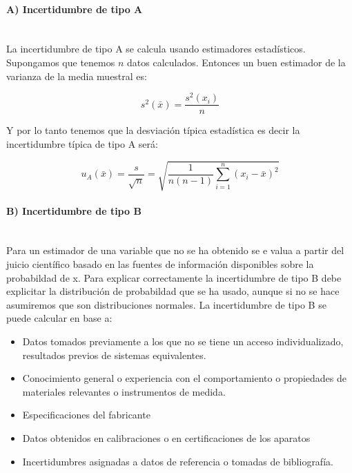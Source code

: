 \documentclass[12pt,a4paper]{book}
\begin{document}
\paragraph{A) Incertidumbre de tipo A \\ \\}

La incertidumbre de tipo A se calcula usando estimadores estadísticos. Supongamos que tenemos $n$ datos calculados. Entonces un buen estimador de la varianza de la media muestral es:

\begin{equation}
s^2(\bar{x}) = \dfrac{s^2(x_i)}{n}
\end{equation}

Y por lo tanto tenemos que la desviación típica estadística es decir la incertidumbre típica de tipo A será:

\begin{equation}
u_A(\bar{x}) = \dfrac{s}{\sqrt{n}} = \sqrt{\dfrac{1}{n (n-1)} \sum_{i=1}^n (x_i - \bar{x})^2}
\end{equation}

\paragraph{B) Incertidumbre de tipo B \\ \\}

Para un estimador de una variable que no se ha obtenido se e valua a partir del juicio científico basado en las fuentes de información disponibles sobre la probabildad de x. Para explicar correctamente la incertidumbre de tipo B debe explicitar la distribución de probabildad que se ha usado, aunque si no se hace asumiremos que son distribuciones normales. La incertidumbre de tipo B se puede calcular en base a:

\begin{itemize}
\item Datos tomados previamente a los que no se tiene un acceso individualizado, resultados previos de sistemas equivalentes.
\item Conocimiento general o experiencia con el comportamiento o propiedades de materiales relevantes o instrumentos de medida.
\item Especificaciones del fabricante
\item Datos obtenidos en calibraciones o en certificaciones de los aparatos
\item Incertidumbres asignadas a datos de referencia o tomadas de bibliografía. 
\end{itemize}
\end{document}
